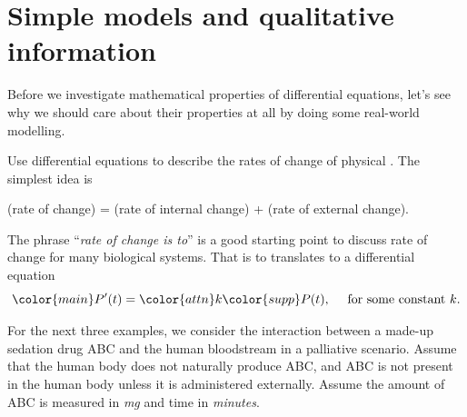 \documentclass[../main.tex]{subfiles}
\begin{document}
 \section{Simple models and qualitative information}

Before we investigate mathematical properties of differential equations, let's see why we should care about their properties at all by doing some real-world modelling. 

\begin{method} \label{method:diff-eq-model}
  Use differential equations to describe the rates of change of physical .  The simplest idea is
  \begin{center}
    (rate of change) = (rate of internal change) + (rate of external change).
  \end{center}
\end{method}


The phrase ``\emph{rate of change is  to}'' is a good starting point to discuss rate of  change for many biological systems.  That  is  to  translates to a differential equation 
\[
  {\color{main}P'(t)} = {\color{attn} k} {\color{supp} P(t)},\quad \text{ for some constant } k.
\]

%

For the next three examples, we consider the interaction between a made-up sedation drug ABC and the human bloodstream in a  palliative scenario. %
Assume that the human body does not naturally produce ABC, and ABC is not present in the human body unless it is administered externally. 
Assume the amount of ABC is measured in \emph{mg} and time in \emph{minutes}.
\end{document}
